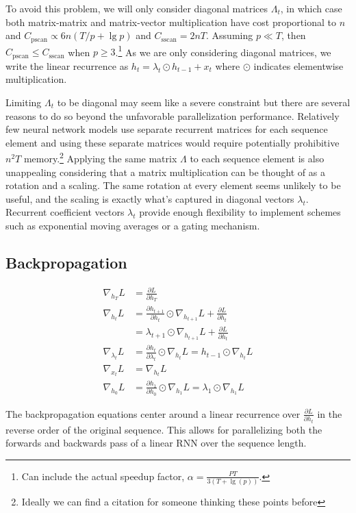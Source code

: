 \documentclass{article}
\begin{document}
To avoid this problem, we will only consider diagonal matrices $\Lambda_t$, in
which case both matrix-matrix and matrix-vector multiplication have cost
proportional to $n$ and $C_\text{pscan}\propto 6n(T/p + \lg p)$ and
$C_\text{sscan}=2nT$. Assuming $p \ll T$, then $C_\text{pscan} \le
C_\text{sscan}$ when $p \ge 3$.\footnote{Can include the actual speedup
  factor, \(\alpha = \frac{PT}{3(T + \lg(p))}\).}
As we are only considering diagonal matrices,
we write the linear recurrence as $h_t = \lambda_t \odot h_{t-1} + x_t$
where $\odot$ indicates elementwise multiplication.

Limiting $\Lambda_t$ to be diagonal may seem like a severe constraint but there are
several reasons to do so beyond the unfavorable parallelization performance. Relatively few neural
network models use separate recurrent matrices for each sequence element and using these
separate matrices would require potentially prohibitive $n^2T$ memory.\footnote{Ideally we can
  find a citation for someone thinking these points before}
Applying
the same matrix $\Lambda$ to each sequence element is also unappealing considering that a matrix
multiplication can be thought of as a rotation and a scaling. The same rotation at every
element seems unlikely to be useful, and the scaling is exactly what's captured in diagonal
vectors $\lambda_t$. Recurrent coefficient vectors $\lambda_t$ provide enough flexibility
to implement schemes such as exponential moving averages or a gating mechanism.


\subsection{Backpropagation}
\begin{align*}
\nabla_{h_T}L &= \frac{\partial L}{\partial h_T} \\
\nabla_{h_t}L &= \frac{\partial h_{t+1}}{\partial h_t} \odot \nabla_{h_{t+1}} L + \frac{\partial L}{\partial h_t} \\ 
&= \lambda_{t+1} \odot \nabla_{h_{t+1}} L + \frac{\partial L}{\partial h_t} \\
\nabla_{\lambda_t}L &= \frac{\partial h_t}{\partial\lambda_t} \odot \nabla_{h_t}L = h_{t-1} \odot \nabla_{h_t}L \\
\nabla_{x_t}L &= \nabla_{h_t} L \\
\nabla_{h_0}L &=  \frac{\partial h_1}{\partial h_0} \odot \nabla_{h_1} L = \lambda_1 \odot \nabla_{h_1} L
\end{align*}

The backpropagation equations center around a linear recurrence over $\frac{\partial L}{\partial h_t}$ in the reverse order of the original sequence. This allows for parallelizing both the forwards and backwards pass of a linear RNN over the sequence length.
\end{document}
